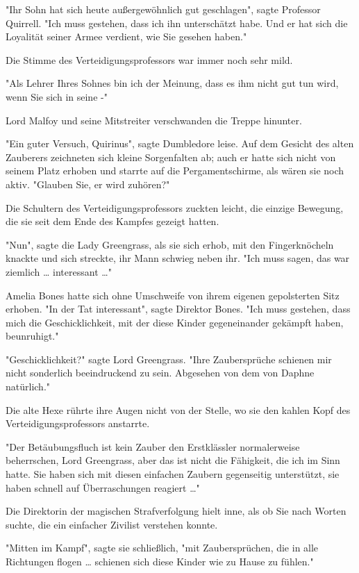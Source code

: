 {"Ihr Sohn hat sich heute außergewöhnlich gut geschlagen", sagte Professor Quirrell. "Ich muss gestehen, dass ich ihn unterschätzt habe. Und er hat sich die Loyalität seiner Armee verdient, wie Sie gesehen haben."

Die Stimme des Verteidigungsprofessors war immer noch sehr mild.

"Als Lehrer Ihres Sohnes bin ich der Meinung, dass es ihm nicht gut tun wird, wenn Sie sich in seine -"

Lord Malfoy und seine Mitstreiter verschwanden die Treppe hinunter.

"Ein guter Versuch, Quirinus", sagte Dumbledore leise. Auf dem Gesicht des alten Zauberers zeichneten sich kleine Sorgenfalten ab; auch er hatte sich nicht von seinem Platz erhoben und starrte auf die Pergamentschirme, als wären sie noch aktiv. "Glauben Sie, er wird zuhören?"

Die Schultern des Verteidigungsprofessors zuckten leicht, die einzige Bewegung, die sie seit dem Ende des Kampfes gezeigt hatten.

"Nun", sagte die Lady Greengrass, als sie sich erhob, mit den Fingerknöcheln knackte und sich streckte, ihr Mann schwieg neben ihr. "Ich muss sagen, das war ziemlich … interessant …"

Amelia Bones hatte sich ohne Umschweife von ihrem eigenen gepolsterten Sitz erhoben. "In der Tat interessant", sagte Direktor Bones. "Ich muss gestehen, dass mich die Geschicklichkeit, mit der diese Kinder gegeneinander gekämpft haben, beunruhigt."

"Geschicklichkeit?" sagte Lord Greengrass. "Ihre Zaubersprüche schienen mir nicht sonderlich beeindruckend zu sein. Abgesehen von dem von Daphne natürlich."

Die alte Hexe rührte ihre Augen nicht von der Stelle, wo sie den kahlen Kopf des Verteidigungsprofessors anstarrte.

"Der Betäubungsfluch ist kein Zauber den Erstklässler normalerweise beherrschen, Lord Greengrass, aber das ist nicht die Fähigkeit, die ich im Sinn hatte. Sie haben sich mit diesen einfachen Zaubern gegenseitig unterstützt, sie haben schnell auf Überraschungen reagiert …"

Die Direktorin der magischen Strafverfolgung hielt inne, als ob Sie nach Worten suchte, die ein einfacher Zivilist verstehen konnte.

"Mitten im Kampf", sagte sie schließlich, "mit Zaubersprüchen, die in alle Richtungen flogen … schienen sich diese Kinder wie zu Hause zu fühlen."

}
